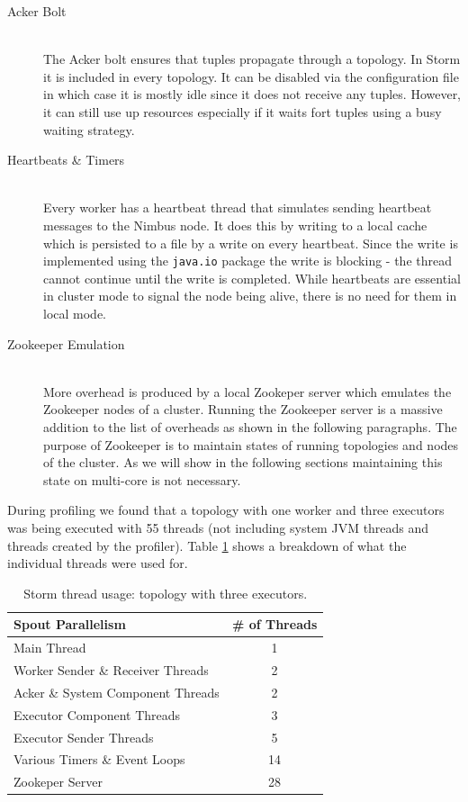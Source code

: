\begin{description}
	\item[Acker Bolt] \hfill \\
	The Acker bolt ensures that tuples propagate through a topology. In Storm it is included in every topology. It can be disabled via the configuration file in which case it is mostly idle since it does not receive any tuples. However, it can still use up resources especially if it waits fort tuples using a busy waiting strategy.
	\item[Heartbeats \& Timers] \hfill \\
	Every worker has a heartbeat thread that simulates sending heartbeat messages to the Nimbus node. It does this by writing to a local cache which is persisted to a file by a write on every heartbeat. Since the write is implemented using the \texttt{java.io} package the write is blocking - the thread cannot continue until the write is completed. While heartbeats are essential in cluster mode to signal the node being alive, there is no need for them in local mode.
	\item[Zookeeper Emulation] \hfill \\
	More overhead is produced by a local Zookeper server which emulates the Zookeeper nodes of a cluster. Running the Zookeeper server is a massive addition to the list of overheads as shown in the following paragraphs. The purpose of Zookeeper is to maintain states of running topologies and nodes of the cluster. As we will show in the following sections maintaining this state on multi-core is not necessary.
\end{description}

During profiling we found that a topology with one worker and three executors was being executed with 55 threads (not including system JVM threads and threads created by the profiler). Table \ref{table:breakdown} shows a breakdown of what the individual threads were used for.

\begin{table}[htb!]
\centering
\small
\begin{tabular}{@{}lc@{}}
    \textbf{Spout Parallelism} & \textbf{\# of Threads} \\ \toprule
    Main Thread & 1  \\
	Worker Sender \& Receiver Threads & 2  \\
    Acker \& System Component Threads & 2  \\
    Executor Component Threads & 3  \\
    Executor Sender Threads & 5  \\
    Various Timers \& Event Loops & 14  \\
    Zookeper Server & 28  \\
\end{tabular}
\caption[Storm thread usage]{Storm thread usage: topology with three executors.}
\label{table:breakdown}
\end{table}


